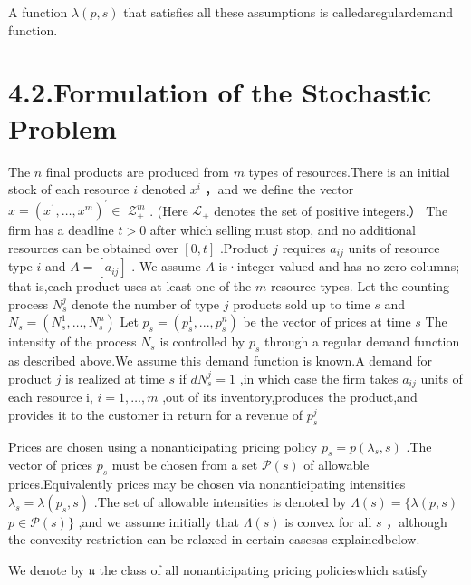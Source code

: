 A function \(\lambda ( p , s )\) that satisfies all these assumptions is calledaregulardemand function.

\section{4.2.Formulation of the Stochastic Problem}\label{formulation-of-the-stochastic-problem}

The \(n\) final products are produced from \(m\) types of resources.There is an initial stock of each resource \(i\) denoted \(x ^ { i }\) ，and we define the vector \(x = ( x ^ { 1 } , \ldots , x ^ { m } ) ^ { \prime } \in\) \(\mathscr { Z } _ { + } ^ { m }\) . (Here \(\mathscr { L } _ { + }\) denotes the set of positive integers.） The firm has a deadline \(t > 0\) after which selling must stop, and no additional resources can be obtained over \([ 0 , t ]\) .Product \(j\) requires \(a _ { i j }\) units of resource type \(i\) and \(A = [ a _ { i j } ]\) . We assume \(A\) is·integer valued and has no zero columns; that is,each product uses at least one of the \(m\) resource types. Let the counting process \(N _ { s } ^ { j }\) denote the number of type \(j\) products sold up to time \(s\) and \(N _ { s } = ( N _ { s } ^ { 1 } , \ldots , N _ { s } ^ { n } )\) Let \(p _ { s } = ( p _ { s } ^ { 1 } , . . . , p _ { s } ^ { n } )\) be the vector of prices at time \(s\) The intensity of the process \(N _ { s }\) is controlled by \(p _ { s }\) through a regular demand function as described above.We assume this demand function is known.A demand for product \(j\) is realized at time \(s\) if \(d N _ { s } ^ { j } = 1\) ,in which case the firm takes \(a _ { i j }\) units of each resource i, \(i = 1 , \ldots , m\) ,out of its inventory,produces the product,and provides it to the customer in return for a revenue of \(p _ { s } ^ { j }\)

Prices are chosen using a nonanticipating pricing policy \(p _ { s } = p ( \lambda _ { s } , s )\) .The vector of prices \(p _ { s }\) must be chosen from a set \({ \mathcal { P } } ( s )\) of allowable prices.Equivalently prices may be chosen via nonanticipating intensities \(\lambda _ { s } = \lambda ( p _ { s } , s )\) .The set of allowable intensities is denoted by \(\Lambda ( s ) = \{ \lambda ( p , s )\) \(p \in \mathcal { P } ( s ) \}\) ,and we assume initially that \(\Lambda ( s )\) is convex for all \(s\) ，although the convexity restriction can be relaxed in certain casesas explainedbelow.

We denote by \(\mathfrak { u }\) the class of all nonanticipating pricing policieswhich satisfy

